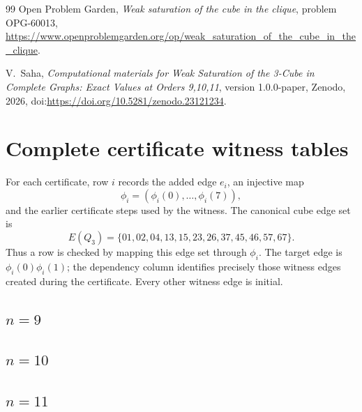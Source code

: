 \documentclass[11pt]{article}
\numberwithin{equation}{section}
\begin{document}
\begin{thebibliography}{99}
Open Problem Garden,
\newblock \emph{Weak saturation of the cube in the clique}, problem OPG-60013,
\newblock \url{https://www.openproblemgarden.org/op/weak_saturation_of_the_cube_in_the_clique}.

V.~Saha,
\newblock \emph{Computational materials for Weak Saturation of the 3-Cube in Complete Graphs: Exact Values at Orders 9,10,11},
\newblock version 1.0.0-paper,
\newblock Zenodo, 2026,
\newblock doi:\url{https://doi.org/10.5281/zenodo.23121234}.

\end{thebibliography}
\endgroup

\newpage
\appendix

\section{Complete certificate witness tables}\label{app:witness}
For each certificate, row $i$ records the added edge $e_i$, an injective map
\[
\phi_i=(\phi_i(0),\ldots,\phi_i(7)),
\]
and the earlier certificate steps used by the witness. The canonical cube edge set is
\[
E(Q_3)=\{01,02,04,13,15,23,26,37,45,46,57,67\}.
\]
Thus a row is checked by mapping this edge set through $\phi_i$. The target edge is $\phi_i(0)\phi_i(1)$; the dependency column identifies precisely those witness edges created during the certificate. Every other witness edge is initial.

\subsection*{$n=9$}
\begingroup\scriptsize

\endgroup

\subsection*{$n=10$}
\begingroup\scriptsize

\endgroup

\subsection*{$n=11$}
\begingroup\scriptsize

\endgroup
\end{document}
